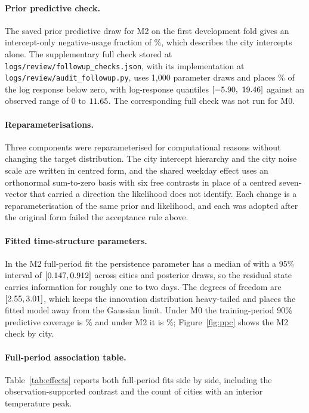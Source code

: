 \documentclass{article}
\begin{document}
\paragraph{Prior predictive check.}
The saved prior predictive draw for M2 on the first development fold gives an intercept-only
negative-usage fraction of \PriorNegIntercept\%, which describes the city intercepts alone. The
supplementary full check stored at \texttt{logs/review/followup\_checks.json}, with its
implementation at \texttt{logs/review/audit\_followup.py}, uses 1{,}000 parameter draws and
places \PriorNegJoint\% of the log response below zero, with log-response quantiles
$[\PriorLogLow,\ \PriorLogHigh]$ against an observed range of $0$ to $11.65$. The corresponding
full check was not run for M0.

\paragraph{Reparameterisations.}
Three components were reparameterised for computational reasons without changing the target
distribution. The city intercept hierarchy and the city noise scale are written in centred form, and
the shared weekday effect uses an orthonormal sum-to-zero basis with six free contrasts in place of a
centred seven-vector that carried a direction the likelihood does not identify. Each change is a
reparameterisation of the same prior and likelihood, and each was adopted after the original form
failed the acceptance rule above.

\paragraph{Fitted time-structure parameters.}
In the M2 full-period fit the persistence parameter has a median of \PhiMTwoMed{} with a 95\%
interval of $[0.147,0.912]$ across cities and posterior draws, so the residual state carries
information for roughly one to two days. The degrees of freedom are \NuMTwoMed{}
$[2.55,3.01]$, which keeps the innovation distribution heavy-tailed and places the fitted
model away from the Gaussian limit. Under M0 the training-period 90\% predictive coverage is
\MZeroDevOneTrainCov\% and under M2 it is \MTwoDevOneTrainCov\%; Figure~\ref{fig:ppc} shows the M2
check by city.

\paragraph{Full-period association table.}
Table~\ref{tab:effects} reports both full-period fits side by side, including the
observation-supported contrast and the count of cities with an interior temperature peak.
\end{document}
